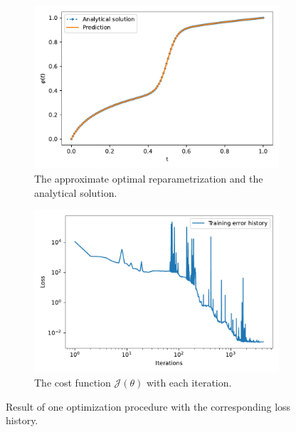 \begin{figure}[b]
    \begin{subfigure}[t]{0.5\textwidth}
        \centering
        \includegraphics[width=\linewidth]{figures/curve_1/eks_7/plot_2_0.pdf}
        \caption{The approximate optimal reparametrization and the analytical solution.}\label{fig:curve_1_solution}
    \end{subfigure}
    \begin{subfigure}[t]{0.5\textwidth}
        \centering
        \includegraphics[width=\linewidth]{figures/curve_1/eks_7/history_plot_2.pdf}
        \caption{The cost function \(\mathcal{J}(\theta)\) with each iteration.}\label{fig:curve_1_history}
    \end{subfigure}
    \caption{Result of one optimization procedure with the corresponding loss history.}\label{fig:curve_1_example}
\end{figure}


